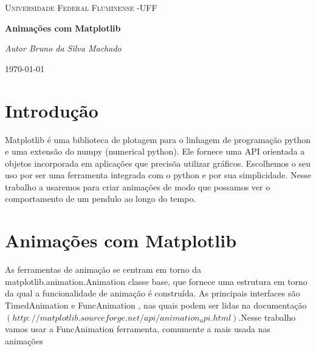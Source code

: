 \documentclass[dvipsnames,a4paper,11pt]{article}
\begin{document}

\author{Bruno da silva}

\selectfont
\begin{titlepage}
	\begin{center}
		{\scshape\Large Universidade Federal Fluminense -UFF \par}
		\vspace{7cm}
		{\huge\bfseries Animações com Matplotlib \par}
		\vspace{6cm}
		{\itshape Autor Bruno da Silva Machado \par}      
			
		\vspace{6.5cm}    
			
		\vfill
		{\large \today\par}
	\end{center}
\end{titlepage}

\setcounter{secnumdepth}{0}
\section{Introdu\c{c}\~{a}o}
\noindent

Matplotlib \'{e} uma biblioteca de plotagem para o linhagem de programa\c{c}\~{a}o python e uma extens\~{a}o do numpy (numerical python). Ele fornece uma API orientada a objetos incorporada em aplica\c{c}\~{o}es que precis\~{o}a utilizar gr\'{a}ficos. Escolhemos o seu uso por ser uma ferramenta integrada com o python e por sua simplicidade. Nesse trabalho a usaremos para criar animações de modo que possamos ver o comportamento de um pendulo ao longo do tempo. 
\noindent \eject 

\section{Animações com Matplotlib}
\noindent 

As ferramentas de animação se centram em torno da matplotlib.animation.Animation classe base, que fornece uma estrutura em torno da qual a funcionalidade de animação é construída. As principais interfaces são TimedAnimation e FuncAnimation , nas quais podem ser lidas na documentação $(http://matplotlib.sourceforge.net/api/animation_api.html)$.Nesse trabalho vamos usar a FuncAnimation ferramenta, comumente a mais usada nas animações
\end{document}
